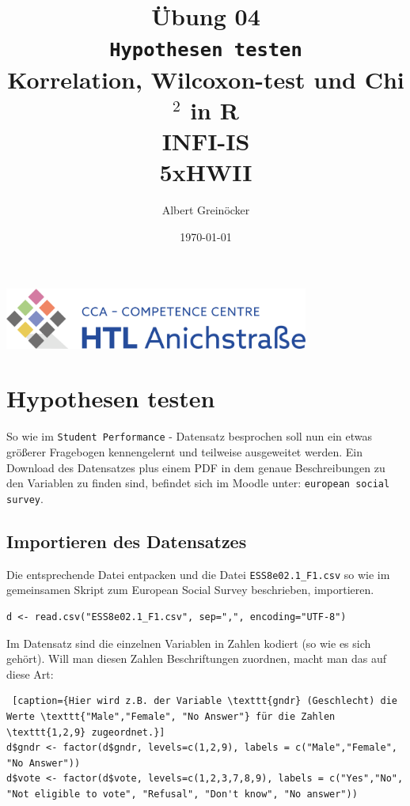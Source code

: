 \documentclass{article}
\title{Übung 04 \\ \texttt{Hypothesen testen} \\ Korrelation, Wilcoxon-test und Chi$^{2}$ in \textbf{R} \\ INFI-IS \\ 5xHWII} %
\author{Albert Greinöcker}
\date{\today} %
\begin{document}
	
	\maketitle %
	
	\begin{center}
		
		\includegraphics[width=10cm]{../images/logo.png}
	\end{center}
	\vspace{1cm}

\section{Hypothesen testen}


So wie im \texttt{Student Performance} - Datensatz besprochen soll nun ein etwas größerer Fragebogen kennengelernt und teilweise ausgeweitet werden. Ein Download des Datensatzes plus einem PDF in dem genaue Beschreibungen zu den Variablen zu finden sind, befindet sich im Moodle unter: \texttt{european social survey}.


\subsection{Importieren des Datensatzes}

Die entsprechende Datei entpacken und die Datei \texttt{ESS8e02.1\_F1.csv}  so wie im gemeinsamen Skript zum European Social Survey beschrieben, importieren.

 \begin{lstlisting} 
d <- read.csv("ESS8e02.1_F1.csv", sep=",", encoding="UTF-8") 
 \end{lstlisting}

Im Datensatz sind die einzelnen Variablen in Zahlen kodiert (so wie es sich gehört). Will man diesen Zahlen Beschriftungen zuordnen, macht man das auf diese Art:

 \begin{lstlisting} [caption={Hier wird z.B. der Variable \texttt{gndr} (Geschlecht) die Werte \texttt{"Male","Female", "No Answer"} für die Zahlen \texttt{1,2,9} zugeordnet.}]
d$gndr <- factor(d$gndr, levels=c(1,2,9), labels = c("Male","Female", "No Answer"))
d$vote <- factor(d$vote, levels=c(1,2,3,7,8,9), labels = c("Yes","No", "Not eligible to vote", "Refusal", "Don't know", "No answer"))
 \end{lstlisting}
\end{document}
